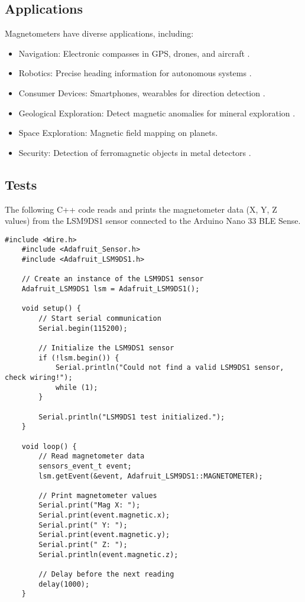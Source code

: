 \subsection{Applications}
Magnetometers have diverse applications, including:
\begin{itemize}
	\item Navigation: Electronic compasses in GPS, drones, and aircraft \cite{Sherwood:2013}.
	\item Robotics: Precise heading information for autonomous systems \cite{IEEE:2020}.
	\item Consumer Devices: Smartphones, wearables for direction detection \cite{AsahiKasei:2014}.
	\item Geological Exploration: Detect magnetic anomalies for mineral exploration \cite{Hansen:2017}.
	\item Space Exploration: Magnetic field mapping on planets.
	\item Security: Detection of ferromagnetic objects in metal detectors \cite{Williams:2015}.
\end{itemize}
\subsection{Tests}

The following C++ code reads and prints the magnetometer data (X, Y, Z values) from the LSM9DS1 sensor connected to the Arduino Nano 33 BLE Sense.

\begin{lstlisting}[caption={C++ Code for Arduino to Read Magnetometer Data}, label={lst:cpp_magnetometer}, style=pythonstyle]
	#include <Wire.h>
	#include <Adafruit_Sensor.h>
	#include <Adafruit_LSM9DS1.h>
	
	// Create an instance of the LSM9DS1 sensor
	Adafruit_LSM9DS1 lsm = Adafruit_LSM9DS1();
	
	void setup() {
		// Start serial communication
		Serial.begin(115200);
		
		// Initialize the LSM9DS1 sensor
		if (!lsm.begin()) {
			Serial.println("Could not find a valid LSM9DS1 sensor, check wiring!");
			while (1);
		}
		
		Serial.println("LSM9DS1 test initialized.");
	}
	
	void loop() {
		// Read magnetometer data
		sensors_event_t event;
		lsm.getEvent(&event, Adafruit_LSM9DS1::MAGNETOMETER);
		
		// Print magnetometer values
		Serial.print("Mag X: ");
		Serial.print(event.magnetic.x);
		Serial.print(" Y: ");
		Serial.print(event.magnetic.y);
		Serial.print(" Z: ");
		Serial.println(event.magnetic.z);
		
		// Delay before the next reading
		delay(1000);
	}
\end{lstlisting}

